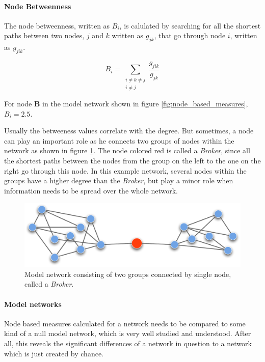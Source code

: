 \paragraph{Node Betweenness}

The node betweenness, written as $B_i$, is calulated by searching for all the shortest paths between two nodes, $j$ and $k$ written as $g_{jk}$, that go through node $i$, written as $g_{jik}$.

\begin{equation}
B_i =	\sum_{
			\substack{i \neq k \neq j \\ i \neq j}
		}
		\frac{g_{jik}}{g_{jk}}
\end{equation}

For node \textbf{B} in the model network shown in figure \ref{fig:node_based_measures}, $B_i = 2.5$.

Usually the betweeness values correlate with the degree. But sometimes, a node can play an important role as he connects two groups of nodes within the network as shown in figure \ref{fig:broker}. The node colored red is called a \textit{Broker}, since all the shortest paths between the nodes from the group on the left to the one on the right go through this node. In this example network, several nodes within the groups have a higher degree than the \textit{Broker}, but play a minor role when information needs to be spread over the whole network. 

\begin{figure}[htpb]
\begin{center}
  \includegraphics[width=.75\textwidth]{assets/pdf/broker.pdf}
  \caption[Model network consisting of two groups]{Model network consisting of two groups connected by single node, called a \textit{Broker}.}
  \label{fig:broker}
\end{center}
\end{figure}

\paragraph{Model networks}

Node based measures calculated for a network needs to be compared to some kind of a null model network, which is very well studied and understood. After all, this reveals the significant differences of a network in question to a network which is just created by chance.

